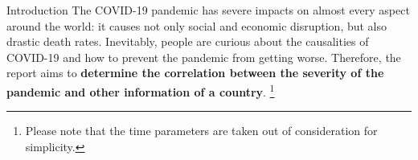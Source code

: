 \begin{frame}{Introduction}
    The COVID-19 pandemic has severe impacts on almost every aspect around the world: it causes not only social and economic disruption, but also drastic death rates. Inevitably, people are curious about the causalities of COVID-19 and how to prevent the pandemic from getting worse. Therefore, the report aims to \textbf{determine the correlation between the severity of the pandemic and other information of a country}. \footnote{Please note that the time parameters are taken out of consideration for simplicity.} 
\end{frame}